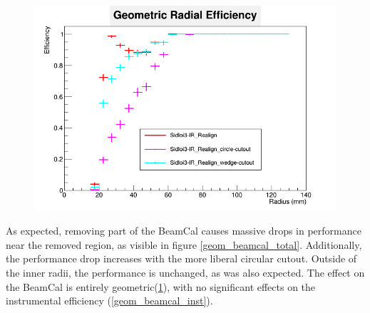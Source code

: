 \documentclass{report}
\begin{document}
                \begin{figure}[H]
                    \includegraphics[width=\textwidth]{RadialEfficiency_geometric_geom}
                    \centering
                    \caption{}
                    \label{geom_beamcal_geom}
                \end{figure}

                As expected, removing part of the BeamCal causes massive drops in performance near the removed region, as visible in figure \ref{geom_beamcal_total}. Additionally, the performance drop increases with the more liberal circular cutout. Outside of the inner radii, the performance is unchanged, as was also expected. The effect on the BeamCal is entirely geometric(\ref{geom_beamcal_geom}), with no significant effects on the instrumental efficiency (\ref{geom_beamcal_inst}).
                
\end{document}
